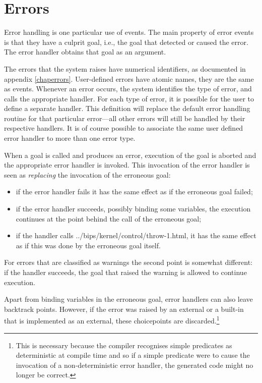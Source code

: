 \section{Errors}
Error handling is one particular use of events.
The main property of error events is that they have a culprit goal,
i.e., the goal that detected or caused the error.
The error handler obtains that goal as an argument.

The errors that the system raises have numerical identifiers,
as documented in appendix \ref{chaperrors}.
User-defined errors have atomic names, they are the same as events.
Whenever an error occurs, the {\eclipse} system identifies the type of error,
and
calls the appropriate handler. For each type of error, it is possible
for the user to define a separate handler. This definition will replace
the default error handling routine for that particular error---all other
errors will still
be handled by their respective
handlers.
It is of
course possible to associate the same user defined error handler to more
than one error type.

When a goal is called and produces an error, execution of the goal
is aborted and the appropriate error handler is invoked.
This invocation of the error handler is seen as \emph{replacing}
the invocation of the erroneous goal:
\begin{itemize}
\item if the error handler fails it has the same effect as if the
erroneous goal failed;
\item if the error handler succeeds, possibly binding some variables,
the execution continues at the point behind the call of the erroneous goal;
\item if the handler calls %
{../bips/kernel/control/throw-1.html}, it has the same effect as if
this was done by the erroneous goal itself.
\end{itemize}
For errors that are classified as warnings the second point is somewhat
different: if the handler succeeds, the goal that raised the warning
is allowed to continue execution.

Apart from binding variables in the erroneous goal, error handlers can
also leave backtrack points. However, if the error was raised by
an external or a built-in that is implemented as an external, these
choicepoints are discarded.\footnote{%
  This is necessary because the compiler recognises simple predicates as
  deterministic at compile time and so if a simple predicate were to cause the
  invocation of a non-deterministic error handler, the generated code might no
  longer be correct.}


